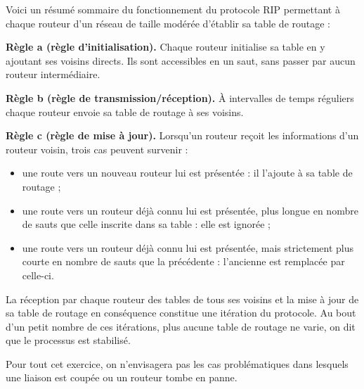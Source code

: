 Voici un résumé sommaire du fonctionnement du protocole RIP permettant à chaque routeur d’un réseau de taille modérée d’établir sa table de routage :\par


\textbf{Règle a (règle d’initialisation).} Chaque routeur initialise sa table en y ajoutant ses voisins directs. Ils sont accessibles en un saut, sans passer par aucun routeur intermédiaire.\par
\textbf{Règle b (règle de transmission/réception).} À intervalles de temps réguliers chaque routeur envoie sa table de routage à ses voisins.\par 
\textbf{Règle c (règle de mise à jour).} Lorsqu’un routeur reçoit les informations d’un routeur voisin, trois cas peuvent survenir :

\begin{itemize}
    \item une route vers un nouveau routeur lui est présentée : il l’ajoute à sa table de routage ;
    \item une route vers un routeur déjà connu lui est présentée, plus longue en nombre de sauts que celle inscrite dans sa table : elle est ignorée ;
    \item une route vers un routeur déjà connu lui est présentée, mais strictement plus courte en nombre de sauts que la précédente : l’ancienne est remplacée par celle-ci.

\end{itemize}

La réception par chaque routeur des tables de tous ses voisins et la mise à jour de sa table de routage en conséquence constitue une itération du protocole. Au bout d’un petit nombre de ces itérations, plus aucune table de routage ne varie, on dit que le processus est stabilisé.
\par 
Pour tout cet exercice, on n’envisagera pas les cas problématiques dans lesquels une liaison est coupée ou un routeur tombe en panne.


